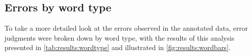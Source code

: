 		\subsection{Errors by word type}
		\label{sec:results:wordtype}
			
			To take a more detailed look at the errors observed in the annotated data, error judgments were broken down by word type, with the results of this analysis presented in \cref{tab:results:wordtype} and illustrated in \cref{fig:results:wordbars}. 
			
			
			
			
